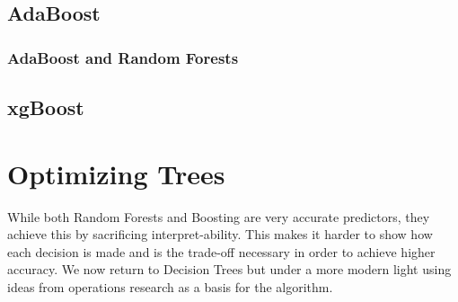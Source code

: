 \documentclass[11pt,a4paper]{report}
\begin{document}
\section{AdaBoost}

\subsection{AdaBoost and Random Forests}

\section{xgBoost}

\chapter{Optimizing Trees}
While both Random Forests and Boosting are very accurate predictors, they achieve this by sacrificing interpret-ability. 
This makes it harder to show how each decision is made and is the trade-off necessary in order to achieve higher accuracy. We now return to Decision Trees but under a more modern light using ideas from operations research as a basis for the algorithm.
\end{document}
